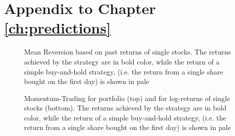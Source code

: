 

\section{Appendix to Chapter \ref{ch:predictions}}

\begin{figure}[h!]
    \centering
    \begin{adjustbox}{width=.95\textwidth,center, scale={1}{0.8}}
        
    \end{adjustbox}  
    \caption{Mean Reversion based on past returns of single stocks. The returns achieved by the strategy are in bold color, while the return of a simple buy-and-hold strategy, (i.e. the return from a single share bought on the first day) is shown in pale}
    \label{fig:mean_reversion_returns}
\end{figure}



\begin{figure}[h!]
    \centering
    \begin{adjustbox}{width=.95\textwidth,center}
        
    \end{adjustbox}  
    \begin{adjustbox}{width=.95\textwidth,center}
        
    \end{adjustbox}      
    \caption{Momentum-Trading for portfolio (top) and for log-returns of single stocks (bottom). The returns achieved by the strategy are in bold color, while the return of a simple buy-and-hold strategy, (i.e. the return from a single share bought on the first day) is shown in pale}
    \label{fig:momentum-trading}
\end{figure}




